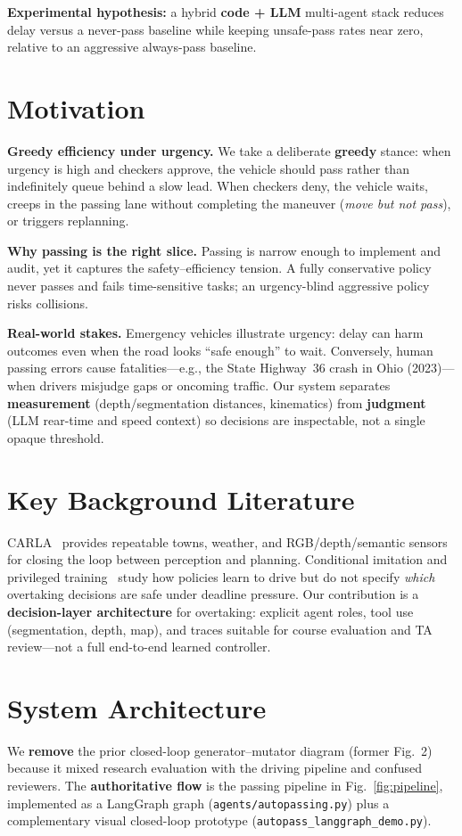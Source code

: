 \documentclass[10pt,twocolumn,letterpaper]{article}
\begin{document}
\textbf{Experimental hypothesis:} a hybrid \textbf{code + LLM} multi-agent stack reduces delay versus a never-pass baseline while keeping unsafe-pass rates near zero, relative to an aggressive always-pass baseline.

\section{Motivation}
\textbf{Greedy efficiency under urgency.}
We take a deliberate \textbf{greedy} stance: when urgency is high and checkers approve, the vehicle should pass rather than indefinitely queue behind a slow lead.
When checkers deny, the vehicle waits, creeps in the passing lane without completing the maneuver (\emph{move but not pass}), or triggers replanning.

\textbf{Why passing is the right slice.}
Passing is narrow enough to implement and audit, yet it captures the safety--efficiency tension.
A fully conservative policy never passes and fails time-sensitive tasks; an urgency-blind aggressive policy risks collisions.

\textbf{Real-world stakes.}
Emergency vehicles illustrate urgency: delay can harm outcomes even when the road looks ``safe enough'' to wait.
Conversely, human passing errors cause fatalities---e.g., the State Highway~36 crash in Ohio (2023)---when drivers misjudge gaps or oncoming traffic.
Our system separates \textbf{measurement} (depth/segmentation distances, kinematics) from \textbf{judgment} (LLM rear-time and speed context) so decisions are inspectable, not a single opaque threshold.

\section{Key Background Literature}
CARLA~\cite{dosovitskiy2017carla} provides repeatable towns, weather, and RGB/depth/semantic sensors for closing the loop between perception and planning.
Conditional imitation and privileged training~\cite{codevilla2018conditional,chen2019learning} study how policies learn to drive but do not specify \emph{which} overtaking decisions are safe under deadline pressure.
Our contribution is a \textbf{decision-layer architecture} for overtaking: explicit agent roles, tool use (segmentation, depth, map), and traces suitable for course evaluation and TA review---not a full end-to-end learned controller.

\section{System Architecture}
We \textbf{remove} the prior closed-loop generator--mutator diagram (former Fig.~2) because it mixed research evaluation with the driving pipeline and confused reviewers.
The \textbf{authoritative flow} is the passing pipeline in Fig.~\ref{fig:pipeline}, implemented as a LangGraph graph (\texttt{agents/autopassing.py}) plus a complementary visual closed-loop prototype (\texttt{autopass\_langgraph\_demo.py}).
\end{document}

